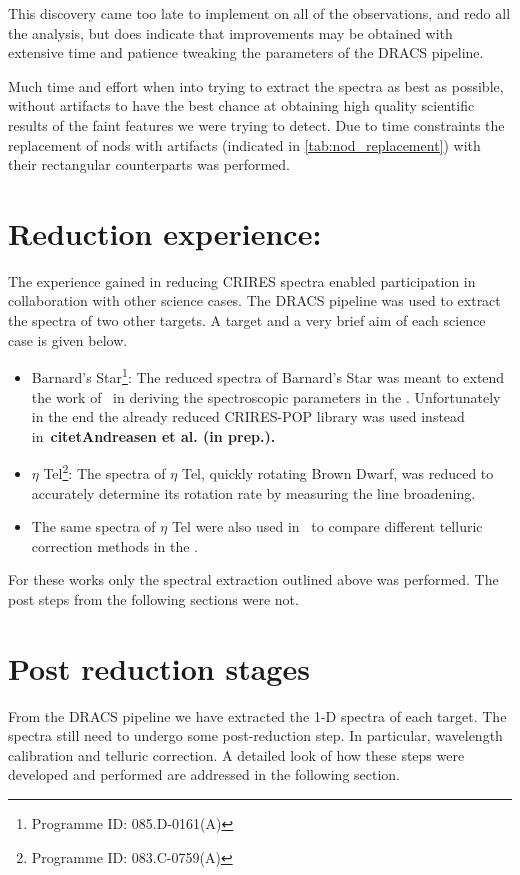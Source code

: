 This discovery came too late to implement on all of the observations, and redo all the analysis, but does indicate that improvements may be obtained with extensive time and patience tweaking the parameters of the DRACS pipeline.

Much time and effort when into trying to extract the spectra as best as possible, without artifacts to have the best chance at obtaining high quality scientific results of the faint features we were trying to detect.
Due to time constraints the replacement of nods with artifacts (indicated in \ref{tab:nod_replacement}) with their rectangular counterparts was performed.  

\section{Reduction experience:}
The experience gained in reducing CRIRES spectra enabled participation in collaboration with other science cases. The DRACS pipeline was used to extract the spectra of two other targets. A target and a very brief aim of each science case is given below.
\begin{itemize}
\item Barnard's Star\footnote{Programme ID: 085.D-0161(A)}: The reduced {\nir} spectra of Barnard's Star was meant to extend the work of~\citet{andreasen_nearinfrared_2016} in deriving the spectroscopic parameters in the \nir. Unfortunately in the end the already reduced CRIRES-POP library was used instead in~\bf{citet{Andreasen et al. (in prep.)}}. 
\item $\eta$ Tel\footnote{Programme ID: 083.C-0759(A)}: The spectra of {$\eta$ Tel}, quickly rotating Brown Dwarf, was reduced to accurately determine its rotation rate by measuring the line broadening. 
\item The same spectra of $\eta$ Tel were also used in~\citet{ulmer-moll_telluric_2018} to compare different telluric correction methods in the \nir.
\end{itemize}

For these works only the spectral extraction outlined above was performed. The post  steps from the following sections were not.


\section{Post reduction stages}
\label{sec:posreduction}
From the DRACS pipeline we have extracted the 1-D spectra of each target. The spectra still need to undergo some post-reduction step. In particular, wavelength calibration and telluric correction. A detailed look of how these steps were developed and performed are addressed in the following section.

